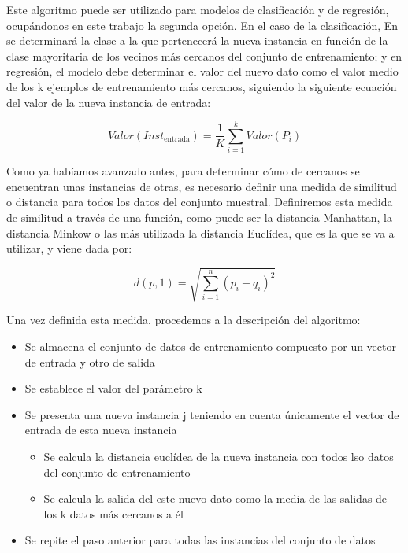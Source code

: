 \documentclass[12pt,a4paper,]{book}
\providecommand{\tightlist}{%
  \setlength{\itemsep}{0pt}\setlength{\parskip}{0pt}}
\numberwithin{dummy}{section}
\theoremstyle{ocrenumbox}
\theoremstyle{blacknumex}
\theoremstyle{blacknumbox}
\theoremstyle{ocrenum}
\theoremstyle{ocrenum}
\begin{document}
Este algoritmo puede ser utilizado para modelos de clasificación y de
regresión, ocupándonos en este trabajo la segunda opción. En el caso de
la clasificación, En se determinará la clase a la que pertenecerá la
nueva instancia en función de la clase mayoritaria de los vecinos más
cercanos del conjunto de entrenamiento; y en regresión, el modelo debe
determinar el valor del nuevo dato como el valor medio de los k ejemplos
de entrenamiento más cercanos, siguiendo la siguiente ecuación del valor
de la nueva instancia de entrada:

\[
Valor(Inst_{\text{entrada}}) = \dfrac{1}{K} \sum_{i=1}^k Valor(P_i)
\]

Como ya habíamos avanzado antes, para determinar cómo de cercanos se
encuentran unas instancias de otras, es necesario definir una medida de
similitud o distancia para todos los datos del conjunto muestral.
Definiremos esta medida de similitud a través de una función, como puede
ser la distancia Manhattan, la distancia Minkow o las más utilizada la
distancia Euclídea, que es la que se va a utilizar, y viene dada por:

\[
d(p,1) = \sqrt{ \sum_{i=1}^n (p_i-q_i)^2}
\]

Una vez definida esta medida, procedemos a la descripción del algoritmo:

\begin{itemize}
\item
  Se almacena el conjunto de datos de entrenamiento compuesto por un
  vector de entrada y otro de salida
\item
  Se establece el valor del parámetro k
\item
  Se presenta una nueva instancia j teniendo en cuenta únicamente el
  vector de entrada de esta nueva instancia

  \begin{itemize}
  \tightlist
  \item
    Se calcula la distancia euclídea de la nueva instancia con todos lso
    datos del conjunto de entrenamiento
  \item
    Se calcula la salida del este nuevo dato como la media de las
    salidas de los k datos más cercanos a él
  \end{itemize}
\item
  Se repite el paso anterior para todas las instancias del conjunto de
  datos
\end{itemize}
\end{document}
